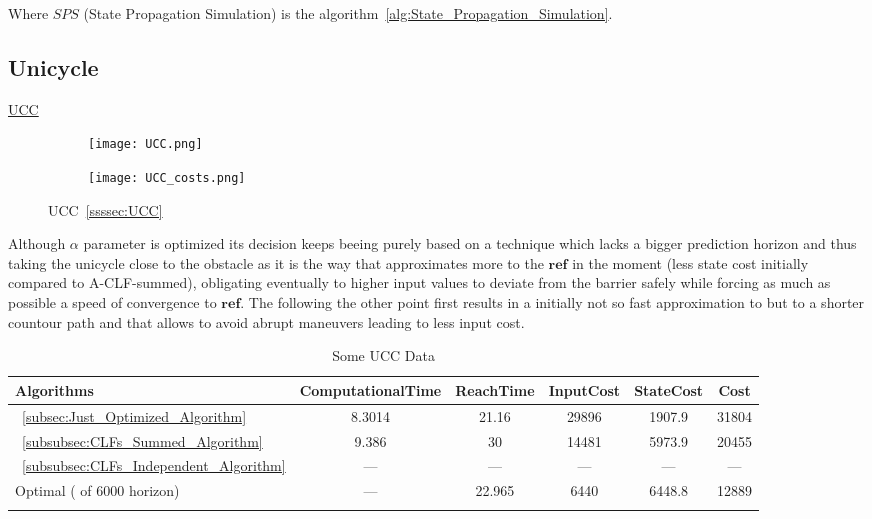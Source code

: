 Where \(SPS\) (State Propagation Simulation) is the algorithm~\ref{alg:State_Propagation_Simulation}.\\



\subsection{Unicycle}
\label{subsec:unicycle_experiments}


\underline{UCC}
\label{ssssec:UCC_experiment} %


\begin{figure}[htbp]
  \begin{subfigure}{0.6\textwidth}
    \centering
    \texttt{[image: UCC.png]}
  \label{fig:UCC_CostEvol}
  \end{subfigure}
  \begin{subfigure}{0.59\textwidth}
    \centering
    \texttt{[image: UCC\_costs.png]}
  \label{fig:UCC_trajectory}
  \end{subfigure}
  \caption{UCC~\ref{ssssec:UCC}}
\label{fig:UCCTrajectory_and_CostEvol}
\end{figure}


Although  \(\alpha\) parameter is optimized its decision keeps beeing purely based on a  technique which lacks a bigger prediction horizon and thus taking the unicycle close to the obstacle as it is the way that approximates more to the \(\mathbf{ref}\) in the moment (less state cost initially compared to A-CLF-summed), obligating eventually to higher input values to deviate from the barrier safely while forcing as much as possible a speed of convergence to \(\mathbf{ref}\).  The  following the other point first results in a initially not so fast approximation to \txtref but to a shorter countour path and that allows to avoid abrupt maneuvers leading to less input cost.  

 \newpage %


  \bgroup
 \begin{xltabular}{\textwidth}{|l|ccccc|}
   \toprule
   Algorithms   & ComputationalTime  & ReachTime  & InputCost   & StateCost & Cost           \\
   \midrule
    ~\ref{subsec:Just_Optimized_Algorithm}           & 8.3014 & 21.16  & 29896 & 1907.9 & 31804 \\
    ~\ref{subsubsec:CLFs_Summed_Algorithm}        & 9.386  & 30     & 14481 & 5973.9 & 20455 \\
    ~\ref{subsubsec:CLFs_Independent_Algorithm}   & ---   & ---      & ---  & ---  & ---  \\
    Optimal ( of 6000 horizon)                        & ---    & 22.965 & 6440  & 6448.8 & 12889 \\
    \midrule
    \caption{Some UCC Data}
    \label{tab:Some_UCC_Data}\\
   \end{xltabular}
 \egroup

